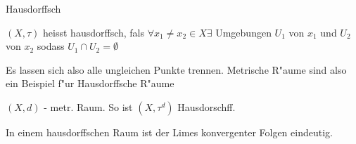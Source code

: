 \documentclass[class=article, crop=false]{standalone}
\begin{document}
\begin{zettel}{Hausdorffsch}
\begin{flashcard}[]{}
	\begin{definition}[hausdorffsch]
		$(X, \tau )$ heisst hausdorffsch, fals $\forall x_1 \neq x_2 \in  X \exists $ Umgebungen $U_1 $  von $x_1 $ und $U_2 $ von $x_2$ sodass $U_1 \cap U_2 = \emptyset$
	\end{definition}

\end{flashcard}
\begin{remark}
	Es lassen sich also alle ungleichen Punkte trennen. Metrische R"aume sind also ein Beispiel f"ur Hausdorffsche R"aume
\end{remark}
\begin{example}
	$(X,d) $ - metr. Raum. So ist $ (X,\tau^d) $ Hausdorschff.
\end{example}
\begin{lemma}
	In einem hausdorffschen Raum ist der Limes konvergenter Folgen eindeutig.
\end{lemma}
\end{zettel}
\end{document}
